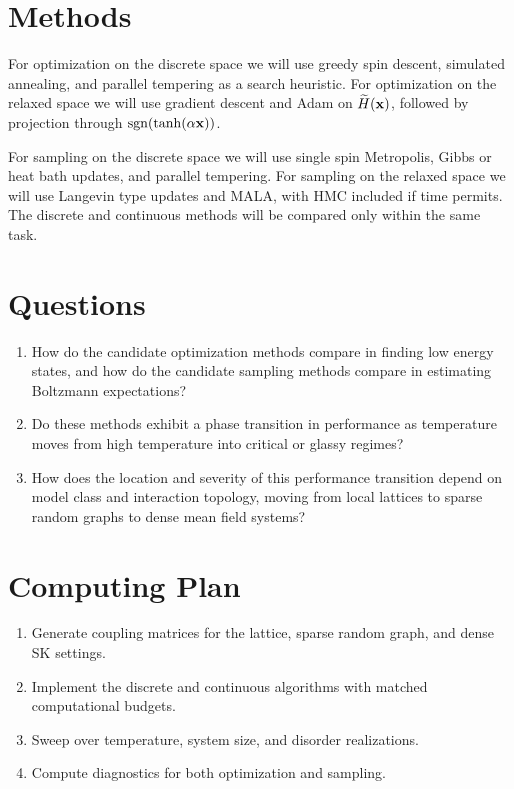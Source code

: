 \documentclass{article}
\begin{document}
\section{Methods}

For optimization on the discrete space we will use greedy spin descent, simulated annealing, and parallel tempering as a search heuristic. For optimization on the relaxed space we will use gradient descent and Adam on $\widetilde H(\vb{x})$, followed by projection through $\mathrm{sgn}(\tanh(\alpha \vb{x}))$.

For sampling on the discrete space we will use single spin Metropolis, Gibbs or heat bath updates, and parallel tempering. For sampling on the relaxed space we will use Langevin type updates and MALA, with HMC included if time permits. The discrete and continuous methods will be compared only within the same task.

\section{Questions}

\begin{enumerate}
    \item How do the candidate optimization methods compare in finding low energy states, and how do the candidate sampling methods compare in estimating Boltzmann expectations?
    \item Do these methods exhibit a phase transition in performance as temperature moves from high temperature into critical or glassy regimes?
    \item How does the location and severity of this performance transition depend on model class and interaction topology, moving from local lattices to sparse random graphs to dense mean field systems?
\end{enumerate}

\section{Computing Plan}

\begin{enumerate}
    \item Generate coupling matrices for the lattice, sparse random graph, and dense SK settings.
    \item Implement the discrete and continuous algorithms with matched computational budgets.
    \item Sweep over temperature, system size, and disorder realizations.
    \item Compute diagnostics for both optimization and sampling.
\end{enumerate}
\end{document}

